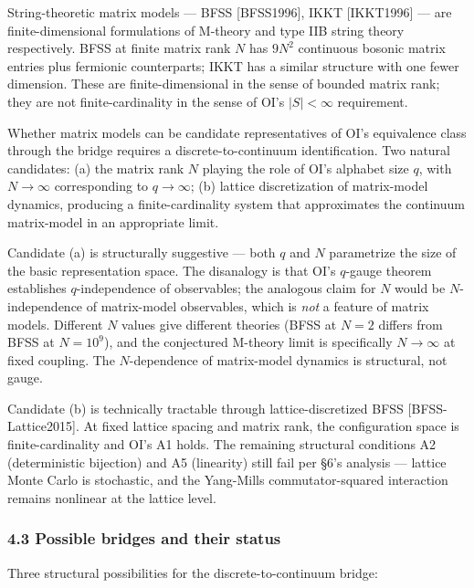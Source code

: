 \documentclass[
]{article}
\begin{document}
String-theoretic matrix models --- BFSS {[}BFSS1996{]}, IKKT
{[}IKKT1996{]} --- are finite-dimensional formulations of M-theory and
type IIB string theory respectively. BFSS at finite matrix rank \(N\)
has \(9N^2\) continuous bosonic matrix entries plus fermionic
counterparts; IKKT has a similar structure with one fewer dimension.
These are finite-dimensional in the sense of bounded matrix rank; they
are not finite-cardinality in the sense of OI's \(|S| < \infty\)
requirement.

Whether matrix models can be candidate representatives of OI's
equivalence class through the bridge requires a discrete-to-continuum
identification. Two natural candidates: (a) the matrix rank \(N\)
playing the role of OI's alphabet size \(q\), with \(N \to \infty\)
corresponding to \(q \to \infty\); (b) lattice discretization of
matrix-model dynamics, producing a finite-cardinality system that
approximates the continuum matrix-model in an appropriate limit.

Candidate (a) is structurally suggestive --- both \(q\) and \(N\)
parametrize the size of the basic representation space. The disanalogy
is that OI's \(q\)-gauge theorem establishes \(q\)-independence of
observables; the analogous claim for \(N\) would be \(N\)-independence
of matrix-model observables, which is \emph{not} a feature of matrix
models. Different \(N\) values give different theories (BFSS at \(N=2\)
differs from BFSS at \(N=10^9\)), and the conjectured M-theory limit is
specifically \(N \to \infty\) at fixed coupling. The \(N\)-dependence of
matrix-model dynamics is structural, not gauge.

Candidate (b) is technically tractable through lattice-discretized BFSS
{[}BFSS-Lattice2015{]}. At fixed lattice spacing and matrix rank, the
configuration space is finite-cardinality and OI's A1 holds. The
remaining structural conditions A2 (deterministic bijection) and A5
(linearity) still fail per §6's analysis --- lattice Monte Carlo is
stochastic, and the Yang-Mills commutator-squared interaction remains
nonlinear at the lattice level.

\hypertarget{possible-bridges-and-their-status}{%
\subsubsection{4.3 Possible bridges and their
status}\label{possible-bridges-and-their-status}}

Three structural possibilities for the discrete-to-continuum bridge:
\end{document}
